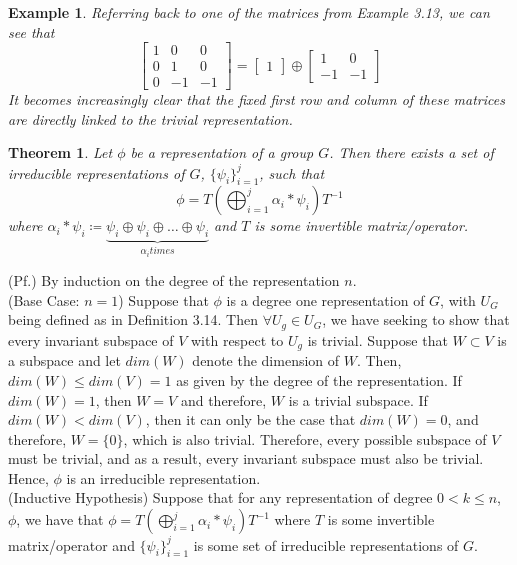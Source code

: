 \documentclass[10pt]{ucthesis}
\newtheorem{theorem}[definition]{Theorem}
\newtheorem{example}[definition]{Example}
\begin{document}
\begin{example}
	Referring back to one of the matrices from Example 3.13, we can see that
$$\begin{bmatrix}
	1 & 0 & 0 \\
	0 & 1 & 0 \\
	0 & -1 & -1
\end{bmatrix} = \begin{bmatrix}
					1
					\end{bmatrix} \oplus
					\begin{bmatrix}
						1 & 0 \\
						-1 & -1
					\end{bmatrix}$$
It becomes increasingly clear that the fixed first row and column of these matrices are directly linked to the trivial representation.
\end{example}

\begin{theorem}
	Let $\phi$ be a representation of a group $G$.  Then there exists a set of irreducible representations of $G$, $\{\psi_i\}_{i=1}^j$, such that $$\phi = T\left(\bigoplus_{i=1}^j \alpha_i*\psi_i\right)T^{-1}$$ where $\alpha_i*\psi_i \coloneq \underbrace{\psi_i \oplus \psi_i \oplus \hdots \oplus \psi_i}_{\alpha_i times}$ and $T$ is some invertible matrix/operator. 
\end{theorem}
 
\noindent (Pf.) By induction on the degree of the representation $n$. \\

(Base Case: $n = 1$) Suppose that $\phi$ is a degree one representation of $G$, with $U_G$ being defined as in Definition 3.14. Then $\forall U_g \in U_G$, we have seeking to show that every invariant subspace of $V$ with respect to $U_g$ is trivial. Suppose that $W \subset V$ is a subspace and let $dim(W)$ denote the dimension of $W$. Then, $dim(W) \leq dim(V) = 1$ as given by the degree of the representation. If $dim(W) = 1$, then $W=V$ and therefore, $W$ is a trivial subspace. If $dim(W) < dim(V)$, then it can only be the case that $dim(W) = 0$, and therefore, $W= \{0\}$, which is also trivial. Therefore, every possible subspace of $V$ must be trivial, and as a result, every invariant subspace must also be trivial. Hence, $\phi$ is an irreducible representation. \\

(Inductive Hypothesis) Suppose that for any representation of degree $0<k\leq n$, $\phi$, we have that $\phi =T\left(\bigoplus_{i=1}^j \alpha_i*\psi_i\right)T^{-1}$ where $T$ is some invertible matrix/operator and $\{\psi_i\}_{i=1}^j$ is some set of irreducible representations of $G$. \\
\end{document}
